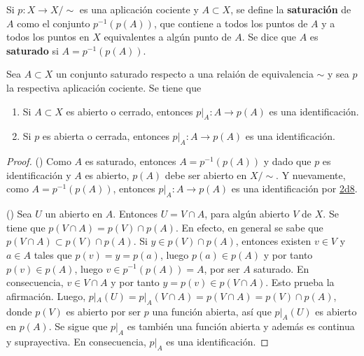 

\begin{definition}
Si $p : X \longrightarrow X/\sim$ es una aplicación cociente y $A \subset X$, se define la \textbf{saturación} de $A$ como el conjunto $p^{-1}(p(A))$, que contiene a todos los puntos de $A$ y a todos los puntos en $X$ equivalentes a algún punto de $A$. Se dice que $A$ es \textbf{saturado} si $A = p^{-1}(p(A))$.
\end{definition}

\begin{proposition}
Sea $A \subset X$ un conjunto saturado respecto a una relaión de equivalencia $\sim$ y sea $p$ la respectiva aplicación cociente. Se tiene que
\begin{enumerate}[label=\textnormal{(\roman*)}]
\item Si $A \subset X$ es abierto o cerrado, entonces $p|_A : A \longrightarrow p(A)$ es una identificación.
\item Si $p$ es abierta o cerrada, entonces $p|_A : A \longrightarrow p(A)$ es una identificación.
\end{enumerate}
\end{proposition}

\begin{proof}
({\scshape{}}) Como $A$ es saturado, entonces $A = p^{-1}(p(A))$ y dado que $p$ es identificación y $A$ es abierto, $p(A)$ debe ser abierto en $X/\sim$. Y nuevamente, como $A = p^{-1}(p(A))$, entonces $p|_A : A \longrightarrow p(A)$ es una identificación por \hyperref[card:2d8]{\textsf{2d8}}.
\bigskip

({\scshape{}}) Sea $U$ un abierto en $A$. Entonces $U = V \cap A$, para algún abierto $V$ de $X$. Se tiene que $p(V \cap A) = p(V) \cap p(A)$. En efecto, en general se sabe que $p(V \cap A) \subset p(V) \cap p(A)$. Si $y \in p(V) \cap p(A)$, entonces existen $v \in V$ y $a \in A$ tales que $ p(v) = y = p(a)$, luego $p(a) \in p(A)$ y por tanto $p(v) \in p(A)$, luego $v \in p^{-1}(p(A)) = A$, por ser $A$ saturado. En consecuencia, $v \in V \cap A$ y por tanto $y = p(v) \in p(V \cap A)$. Esto prueba la afirmación. Luego, $p|_A(U) = p|_A(V \cap A) = p(V \cap A) = p(V) \cap p(A)$, donde $p(V)$ es abierto por ser $p$ una función abierta, así que $p|_A(U)$ es abierto en $p(A)$. Se sigue que $p|_A$ es también una función abierta y además es continua y suprayectiva. En consecuencia, $p|_A$ es una identificación.
\end{proof}
